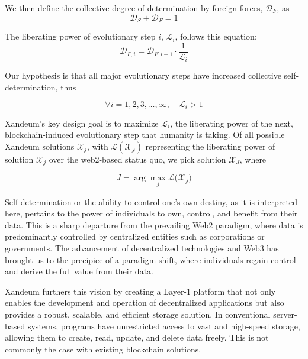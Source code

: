 \documentclass[11pt]{article}   	%
\begin{document}
We then define the collective degree of determination by foreign forces, $\mathcal{D}_{F}$, as
\begin{equation}
\mathcal{D}_{S} + \mathcal{D}_{F} = 1 
\end{equation}

The liberating power of evolutionary step $i$, $\mathcal{L}_{\mathit{i}}$, follows this equation:
\begin{equation}
\mathcal{D}_{F,i} = \mathcal{D}_{F,i-1} \cdot \frac{1}{\mathcal{L_{\mathit{i}}}}
\end{equation}

Our hypothesis is that all major evolutionary steps have increased collective self-determination, thus

\begin{equation}
\forall i = 1, 2, 3, \ldots, \infty, \quad \mathcal{L}_{\mathit{i}} > 1
\end{equation}

Xandeum's key design goal is to maximize $\mathcal{L}_{\mathit{i}}$, the liberating power of the next, blockchain-induced evolutionary step that humanity is taking. Of all possible Xandeum solutions $\mathcal{X}_{j}$, with $\mathcal{L(\mathcal{X}_{j})}$ representing the liberating power of solution $\mathcal{X}_{j}$ over the web2-based status quo, we pick solution $\mathcal{X}_{J}$, where

\begin{equation}
J = \arg \max_{j} \mathcal{L(\mathcal{X_j)}}
\end{equation}

Self-determination or the ability to control one's own destiny, as it is interpreted here, pertains to the power of individuals to own, control, and benefit from their data. This is a sharp departure from the prevailing Web2 paradigm, where data is predominantly controlled by centralized entities such as corporations or governments. The advancement of decentralized technologies and Web3 has brought us to the precipice of a paradigm shift, where individuals regain control and derive the full value from their data.

Xandeum furthers this vision by creating a Layer-1 platform that not only enables the development and operation of decentralized applications but also provides a robust, scalable, and efficient storage solution. In conventional server-based systems, programs have unrestricted access to vast and high-speed storage, allowing them to create, read, update, and delete data freely. This is not commonly the case with existing blockchain solutions.
\end{document}
